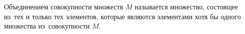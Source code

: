 
    Объединением совокупности множеств $M$ называется множество, состоящее из~тех и только тех элементов,
     которые являются элементами хотя бы одного множества из~совокупности $M$.

